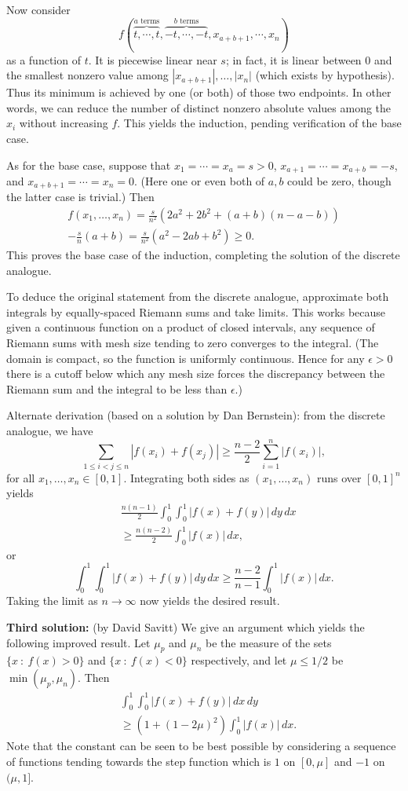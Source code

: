 \documentclass[amssymb,twocolumn,pra,10pt,aps]{revtex4-1}
\begin{document}
\begin{itemize}
Now consider
\[
f(\overbrace{t, \cdots,t}^{\mbox{$a$ terms}},\overbrace{-t,\cdots,-t}^{\mbox{$b$ terms}},x_{a+b+1},\cdots, x_n)
\]
as a function of $t$.
It is piecewise linear near $s$; in fact, it is
linear between 0 and
the smallest nonzero value among $|x_{a+b+1}|, \dots, |x_n|$
(which exists by hypothesis). Thus its minimum is achieved by one (or both)
of those two endpoints. In other words, we can reduce the
number of distinct nonzero absolute values among the $x_i$ without
increasing $f$. This
yields the induction, pending verification of the base case.

As for the base case, suppose that $x_1 = \cdots = x_a = s > 0$,
$x_{a+1} = \cdots = x_{a+b} = -s$, and $x_{a+b+1} = \cdots = x_n = 0$.
(Here one or even both of $a,b$ could be zero, though the latter case
is trivial.)
Then
\begin{multline*}
f(x_1, \dots, x_n) = \frac{s}{n^2} (2a^2 + 2b^2 + (a+b)(n-a-b)) \\
- \frac{s}{n} (a+b) = \frac{s}{n^2} (a^2 -2ab + b^2) \geq 0.
\end{multline*}
This proves the base case of the induction, completing the solution
of the discrete analogue.

To deduce the original statement from the discrete analogue,
approximate both integrals
by equally-spaced Riemann sums and take limits. This works because
given a continuous function
on a product of closed intervals,
any sequence of Riemann sums with mesh size tending to zero
converges to the integral. (The domain is compact, so
the function is uniformly continuous. Hence for any $\epsilon > 0$
there is a cutoff below
which any mesh size forces the
discrepancy between the Riemann sum and the integral to be less than
$\epsilon$.)

Alternate derivation (based on a solution by Dan Bernstein):
from the discrete analogue, we have
\[
\sum_{1 \leq i<j\leq n} |f(x_i) + f(x_j)| \geq \frac{n-2}{2}
\sum_{i=1}^n |f(x_i)|,
\]
for all $x_1, \dots, x_n \in [0,1]$. Integrating both sides as
$(x_1, \dots, x_n)$ runs over
$[0,1]^n$ yields
\begin{align*}
&\frac{n(n-1)}{2} \int_0^1 \int_0^1 |f(x)+f(y)|\,dy\,dx \\
&\geq
\frac{n(n-2)}{2} \int_0^1 |f(x)|\,dx,
\end{align*}
or
\[
\int_0^1 \int_0^1 |f(x)+f(y)|\,dy\,dx
\geq
\frac{n-2}{n-1} \int_0^1 |f(x)|\,dx.
\]
Taking the limit as $n \to \infty$ now yields the desired result.

\textbf{Third solution:} (by David Savitt)
We give an argument which yields the following improved result.  Let
$\mu_p$ and $\mu_n$ be the measure of the sets $\{ x \ : \ f(x) > 0\}$ and
$\{ x \ : \ f(x) < 0\}$ respectively, and let $\mu \le 1/2$ be
$\min(\mu_p,\mu_n)$.  Then
\begin{align*}
& \int_{0}^{1} \int_{0}^{1} |f(x) + f(y)|\,dx\,dy \\
&\ge (1 + (1-2\mu)^2)
\int_{0}^{1} |f(x)|\,dx.
\end{align*}
Note that the constant can be seen to be best possible by considering a
sequence of functions tending towards the step function which is $1$ on
$[0,\mu]$ and $-1$ on $(\mu,1]$.


\end{itemize}
\end{document}
